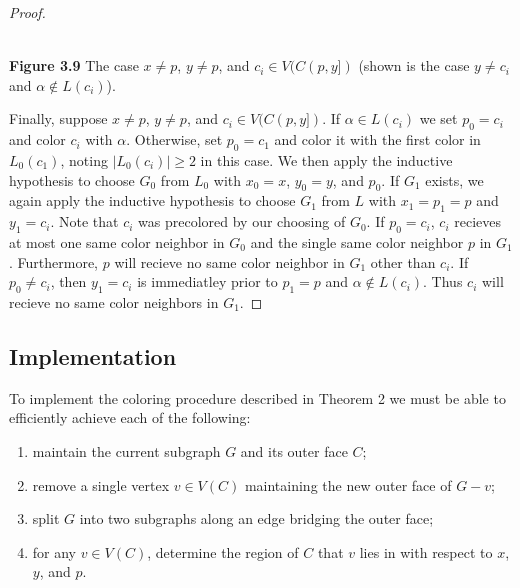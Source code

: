 \documentclass[11pt,letter]{article}
\begin{document}
\begin{proof}
\begin{center}
\hfill\\
\textbf{Figure 3.9} The case $x\ne p$, $y\ne p$, and $c_i\in V(C(p,y])$ (shown is the case $y\ne c_i$ and
$\alpha\not\in L(c_i)$).
\end{center}

\noindent Finally, suppose $x\ne p$, $y\ne p$, and $c_i\in V(C(p,y])$. If
$\alpha\in L(c_i)$ we set $p_0=c_i$ and color $c_i$ with $\alpha$. Otherwise, set $p_0=c_1$ and color it with
the first color in $L_0(c_1)$, noting $|L_0(c_i)|\ge 2$ in this case. We then apply the inductive hypothesis to
choose $G_0$ from $L_0$ with $x_0=x$, $y_0=y$, and $p_0$. If $G_1$ exists, we again apply the inductive
hypothesis to choose $G_1$ from $L$ with $x_1=p_1=p$ and $y_1=c_i$. Note that $c_i$ was precolored by our
choosing of $G_0$. If $p_0=c_i$, $c_i$ recieves at most one same
color neighbor in $G_0$ and the single same color neighbor $p$ in $G_1$. Furthermore, $p$ will recieve no
same color neighbor in $G_1$ other than $c_i$. If $p_0\ne c_i$, then $y_1=c_i$ is immediatley prior to
$p_1=p$ and $\alpha\not\in L(c_i)$. Thus $c_i$ will recieve no same color neighbors in $G_1$.
\end{proof}

\subsection*{Implementation}

To implement the coloring procedure described in Theorem 2 we must be able to efficiently achieve each of
the following:
\begin{enumerate}
\item maintain the current subgraph $G$ and its outer face $C$;
\item remove a single vertex $v\in V(C)$ maintaining the new outer face of $G-v$;
\item split $G$ into two subgraphs along an edge bridging the outer face;
\item for any $v\in V(C)$, determine the region of $C$ that $v$ lies in with respect to $x$, $y$, and $p$.
\end{enumerate}
\end{document}

